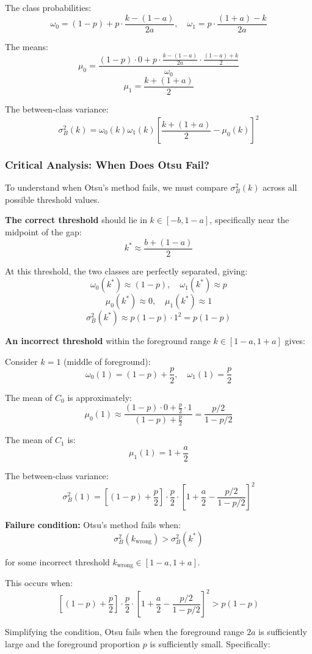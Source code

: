 \documentclass[11pt,a4paper]{article}
\begin{document}
The class probabilities:
$$\omega_0 = (1-p) + p \cdot \frac{k-(1-a)}{2a}, \quad \omega_1 = p \cdot \frac{(1+a)-k}{2a}$$

The means:
$$\mu_0 = \frac{(1-p) \cdot 0 + p \cdot \frac{k-(1-a)}{2a} \cdot \frac{(1-a)+k}{2}}{\omega_0}$$
$$\mu_1 = \frac{k + (1+a)}{2}$$

The between-class variance:
$$\sigma_B^2(k) = \omega_0(k) \omega_1(k) \left[\frac{k+(1+a)}{2} - \mu_0(k)\right]^2$$

\subsubsection{Critical Analysis: When Does Otsu Fail?}

To understand when Otsu's method fails, we must compare $\sigma_B^2(k)$ across all possible threshold values.

\textbf{The correct threshold} should lie in $k \in [-b, 1-a]$, specifically near the midpoint of the gap:
$$k^* \approx \frac{b + (1-a)}{2}$$

At this threshold, the two classes are perfectly separated, giving:
$$\omega_0(k^*) \approx (1-p), \quad \omega_1(k^*) \approx p$$
$$\mu_0(k^*) \approx 0, \quad \mu_1(k^*) \approx 1$$
$$\sigma_B^2(k^*) \approx p(1-p) \cdot 1^2 = p(1-p)$$

\textbf{An incorrect threshold} within the foreground range $k \in [1-a, 1+a]$ gives:

Consider $k = 1$ (middle of foreground):
$$\omega_0(1) = (1-p) + \frac{p}{2}, \quad \omega_1(1) = \frac{p}{2}$$

The mean of $C_0$ is approximately:
$$\mu_0(1) \approx \frac{(1-p) \cdot 0 + \frac{p}{2} \cdot 1}{(1-p) + \frac{p}{2}} = \frac{p/2}{1-p/2}$$

The mean of $C_1$ is:
$$\mu_1(1) = 1 + \frac{a}{2}$$

The between-class variance:
$$\sigma_B^2(1) = \left[(1-p) + \frac{p}{2}\right] \cdot \frac{p}{2} \cdot \left[1 + \frac{a}{2} - \frac{p/2}{1-p/2}\right]^2$$

\textbf{Failure condition:} Otsu's method fails when:
$$\sigma_B^2(k_{\text{wrong}}) > \sigma_B^2(k^*)$$

for some incorrect threshold $k_{\text{wrong}} \in [1-a, 1+a]$.

This occurs when:
$$\left[(1-p) + \frac{p}{2}\right] \cdot \frac{p}{2} \cdot \left[1 + \frac{a}{2} - \frac{p/2}{1-p/2}\right]^2 > p(1-p)$$

Simplifying the condition, Otsu fails when the foreground range $2a$ is sufficiently large and the foreground proportion $p$ is sufficiently small. Specifically:
\end{document}

